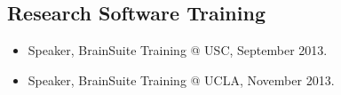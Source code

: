 \documentclass[overlapped,line,letterpaper]{res}
\begin{document}
\begin{resume}
\section{Research Software Training}
\begin{itemize}
\item  Speaker, BrainSuite Training @ USC, September 2013.
\item Speaker, BrainSuite Training @ UCLA, November 2013.
\end{itemize}






\end{resume}
\end{document}
